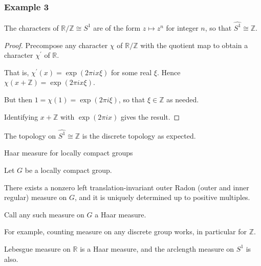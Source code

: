 \documentclass[mathserif
, handout
]{beamer}
\begin{document}
\begin{frame}
    \frametitle{Example 3}
The characters of $\mathbb{R}/\mathbb{Z}\cong S^1$ are of the form $z\mapsto z^n$ for integer $n$, so that $\widehat{S^1}\cong \mathbb{Z}$. \begin{proof}
    Precompose any character $\chi$ of $\mathbb{R}/\mathbb{Z}$ with the quotient map to obtain a character $\chi^\prime$ of $\mathbb{R}$.\pause 

    That is, $\chi^\prime(x) = \exp(2\pi i x\xi)$ for some real $\xi$. Hence $\chi(x+\mathbb{Z}) = \exp(2\pi i x\xi)$.\pause 

    But then $1 = \chi(1) = \exp(2\pi i \xi)$, so that $\xi\in \mathbb{Z}$ as needed. \pause 

    Identifying $x+\mathbb{Z}$ with $\exp(2\pi i x)$ gives the result.
\end{proof} \pause
The topology on $\widehat{S^1}\cong\mathbb{Z}$ is the discrete topology as expected.
\end{frame}

\begin{frame}{Haar measure for locally compact groups}
    \begin{Theorem}[Haar]
        Let $G$ be a locally compact group. \pause 

        There exists a nonzero left translation-invariant outer Radon (outer and inner regular) measure on $G$, and it is uniquely determined up to positive multiples.

        Call any such measure on $G$ a Haar measure.
    \end{Theorem}
    \pause

    For example, counting measure on any discrete group works, in particular for $\mathbb{Z}$. 
    \pause 

    Lebesgue measure on $\mathbb{R}$ is a Haar measure, and the arclength measure on $S^1$ is also.
\end{frame}
\end{document}
